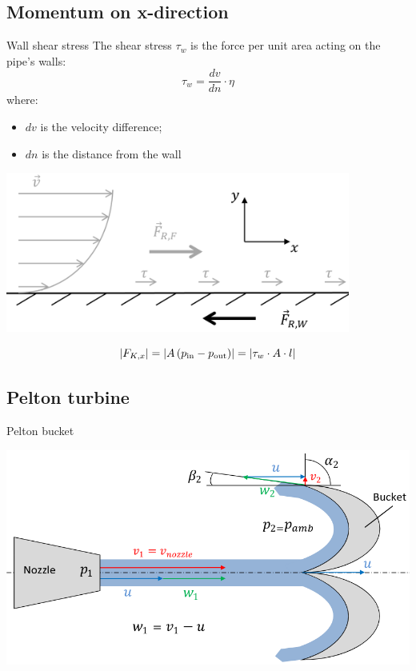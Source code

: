 \documentclass{article}
\begin{document}
\begin{multicols}{2}
\subsection{Momentum on x-direction}
\begin{theorybox}{Wall shear stress}
    The shear stress $\tau_w$ is the force per unit area acting on the
    pipe's walls:
    \begin{equation}
        \tau_w = \frac{dv}{dn}\cdot \eta
    \end{equation}
    where:
    \begin{itemize}
        \item $dv$ is the velocity difference;
        \item $dn$ is the distance from the wall
    \end{itemize}
    \begin{center}
        \includegraphics[width=0.85\textwidth]{media/Wandreibung.png}
    \end{center}
    \begin{equation}
        \left|F_{K,x}\right| = \left|A\left(p_{\rm in} - p_{\rm out}\right)\right| = \left|\tau_w \cdot A \cdot l\right|
    \end{equation}
\end{theorybox}

\subsection{Pelton turbine}
\begin{theorybox}{Pelton bucket}
    \begin{center}
        \includegraphics[width=.85\textwidth]{media/pelton.png}
    \end{center}
\end{theorybox}


\end{multicols}
\end{document}

